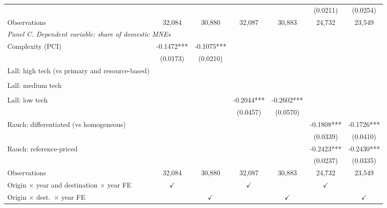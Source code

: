 \begin{tabular}{lcccccc}
 &  &  &  &  & (0.0211) & (0.0254) \\
Observations & 32,084 & 30,880 & 32,087 & 30,883 & 24,732 & 23,549 \\
\midrule
\multicolumn{7}{l}{\textit{Panel C. Dependent variable: share of domestic MNEs}} \\
Complexity (PCI) & -0.1472*** & -0.1075*** &  &  &  &  \\
 & (0.0173) & (0.0210) &  &  &  &  \\
Lall: high tech (vs primary and resource-based) &  &  &  &  &  &  \\
 &  &  &  &  &  &  \\
Lall: medium tech &  &  &  &  &  &  \\
 &  &  &  &  &  &  \\
Lall: low tech &  &  & -0.2044*** & -0.2602*** &  &  \\
 &  &  & (0.0457) & (0.0570) &  &  \\
Rauch: differentiated (vs homogeneous) &  &  &  &  & -0.1808*** & -0.1726*** \\
 &  &  &  &  & (0.0339) & (0.0410) \\
Rauch: reference-priced &  &  &  &  & -0.2423*** & -0.2430*** \\
 &  &  &  &  & (0.0237) & (0.0335) \\
Observations & 32,084 & 30,880 & 32,087 & 30,883 & 24,732 & 23,549 \\
\hline
Origin $\times$ year and destination $\times$ year FE & $\checkmark$ &  & $\checkmark$ &  & $\checkmark$ &  \\
Origin $\times$ dest.\ $\times$ year FE &  & $\checkmark$ &  & $\checkmark$ &  & $\checkmark$ \\
\hline
\end{tabular}
